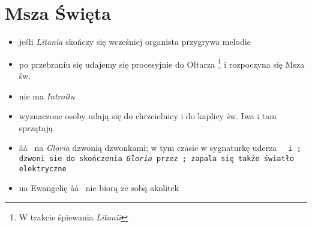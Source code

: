 \section{Msza Święta}

\begin{itemize}
	\item jeśli \textit{Litania} skończy się wcześniej organista przygrywa
	      melodie
	\item po przebraniu się udajemy się procesyjnie do Ołtarza \footnote{W
			  trakcie śpiewania \textit{Litanii}} i rozpoczyna się Msza św.
	\item nie ma \textit{Introitu}
	\item wyznaczone osoby udają się do chrzcielnicy i do kaplicy św. Iwa i tam
	      sprzątają
	\item \aa\aa~ na \textit{Gloria} dzwonią dzwonkami; w tym czasie w
	      sygnaturkę uderza \tt~ i \zz; dzwoni sie do skończenia
	      \textit{Gloria} przez \ii; zapala się także światło elektryczne
	\item na Ewangelię \aa\aa~ nie biorą ze sobą akolitek
\end{itemize}